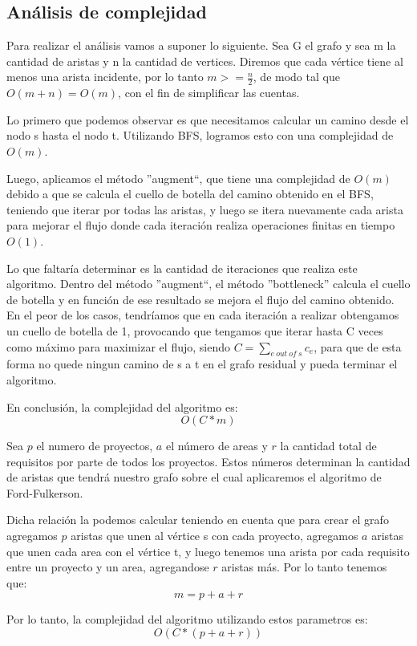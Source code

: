 \subsection{Análisis de complejidad}

Para realizar el análisis vamos a suponer lo siguiente. Sea G el grafo y sea m la cantidad de aristas y n la cantidad de vertices. Diremos que cada vértice tiene al menos una arista incidente, 
por lo tanto $m >= \frac{n}{2}$, de modo tal que $O(m + n) = O(m)$, con el fin de simplificar las cuentas.

Lo primero que podemos observar es que necesitamos calcular un camino desde el nodo s hasta el nodo t. Utilizando BFS, logramos esto con una complejidad de $O(m)$.

Luego, aplicamos el método ''augment``, que tiene una complejidad de $O(m)$ debido a que se calcula el cuello de botella del camino obtenido en el BFS, 
teniendo que iterar por todas las aristas, y luego se itera 
nuevamente cada arista para mejorar el flujo donde cada iteración realiza operaciones finitas 
en tiempo $O(1)$.

Lo que faltaría determinar es la cantidad de iteraciones que realiza este algoritmo.
Dentro del método ''augment``, el método ''bottleneck'' calcula el cuello de botella y en función de ese resultado se mejora el flujo del camino obtenido. En el peor de los casos, tendríamos que en cada 
iteración a realizar obtengamos un cuello de botella de 1, provocando que tengamos que iterar hasta C veces como máximo para maximizar el flujo, siendo $ C = \sum\limits_{e\ out\ of\ s} c_e$, 
para que de esta forma no quede ningun camino de s a t en el grafo residual y pueda terminar el algoritmo.

En conclusión, la complejidad del algoritmo es:
$$ O(C * m) $$

Sea $p$ el numero de proyectos, $a$ el número de areas y $r$ la cantidad total de requisitos por parte de todos los proyectos.
Estos números determinan la cantidad de aristas que tendrá nuestro grafo sobre el cual aplicaremos el algoritmo de Ford-Fulkerson.

Dicha relación la podemos calcular teniendo en cuenta que para crear el grafo agregamos $p$ aristas que unen al vértice s con cada proyecto, 
agregamos $a$ aristas que unen cada area con el vértice t, y luego tenemos una arista por cada requisito entre un proyecto y un area, agregandose $r$ aristas más. Por lo tanto tenemos que:
$$ m = p + a + r $$

Por lo tanto, la complejidad del algoritmo utilizando estos parametros es:
$$ O ( C * (p +a +r)) $$

